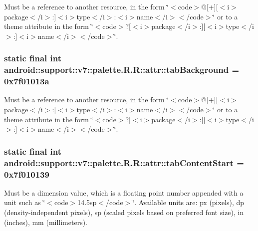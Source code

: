 Must be a reference to another resource, in the form \char`\"{}$<$code$>$@\mbox{[}+\mbox{]}\mbox{[}$<$i$>$package$<$/i$>$:\mbox{]}$<$i$>$type$<$/i$>$:$<$i$>$name$<$/i$>$$<$/code$>$\char`\"{} or to a theme attribute in the form \char`\"{}$<$code$>$?\mbox{[}$<$i$>$package$<$/i$>$:\mbox{]}\mbox{[}$<$i$>$type$<$/i$>$:\mbox{]}$<$i$>$name$<$/i$>$$<$/code$>$\char`\"{}. \hypertarget{classandroid_1_1support_1_1v7_1_1palette_1_1_r_1_1attr_465ae499fb5d0d45d10cfaa029d8b3b2}{
\subsubsection[{tabBackground}]{\setlength{\rightskip}{0pt plus 5cm}static final int android::support::v7::palette.R.R::attr::tabBackground = 0x7f01013a}}
\label{classandroid_1_1support_1_1v7_1_1palette_1_1_r_1_1attr_465ae499fb5d0d45d10cfaa029d8b3b2}


Must be a reference to another resource, in the form \char`\"{}$<$code$>$@\mbox{[}+\mbox{]}\mbox{[}$<$i$>$package$<$/i$>$:\mbox{]}$<$i$>$type$<$/i$>$:$<$i$>$name$<$/i$>$$<$/code$>$\char`\"{} or to a theme attribute in the form \char`\"{}$<$code$>$?\mbox{[}$<$i$>$package$<$/i$>$:\mbox{]}\mbox{[}$<$i$>$type$<$/i$>$:\mbox{]}$<$i$>$name$<$/i$>$$<$/code$>$\char`\"{}. \hypertarget{classandroid_1_1support_1_1v7_1_1palette_1_1_r_1_1attr_36db05c772b564d06994a96344ceccae}{
\subsubsection[{tabContentStart}]{\setlength{\rightskip}{0pt plus 5cm}static final int android::support::v7::palette.R.R::attr::tabContentStart = 0x7f010139}}
\label{classandroid_1_1support_1_1v7_1_1palette_1_1_r_1_1attr_36db05c772b564d06994a96344ceccae}


Must be a dimension value, which is a floating point number appended with a unit such as \char`\"{}$<$code$>$14.5sp$<$/code$>$\char`\"{}. Available units are: px (pixels), dp (density-independent pixels), sp (scaled pixels based on preferred font size), in (inches), mm (millimeters). 


